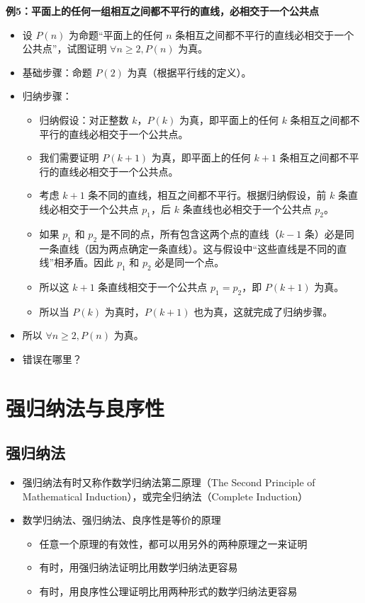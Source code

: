 \documentclass[UTF8]{report}
\theoremstyle{MyLineTheoremStyle} %
\theoremstyle{MyBlockTheoremStyle} %
\theoremstyle{MySubsubsectionStyle} %
\begin{document}
        \textbf{例5：平面上的任何一组相互之间都不平行的直线，必相交于一个公共点}
        \begin{itemize}
            \item 设 $P(n)$ 为命题“平面上的任何 $n$ 条相互之间都不平行的直线必相交于一个公共点”，试图证明 $\forall n \geq 2, P(n)$ 为真。
            \item 基础步骤：命题 $P(2)$ 为真（根据平行线的定义）。
            \item 归纳步骤：
            \begin{itemize}
                \item 归纳假设：对正整数 $k$，$P(k)$ 为真，即平面上的任何 $k$ 条相互之间都不平行的直线必相交于一个公共点。
                \item 我们需要证明 $P(k+1)$ 为真，即平面上的任何 $k+1$ 条相互之间都不平行的直线必相交于一个公共点。
                \item 考虑 $k+1$ 条不同的直线，相互之间都不平行。根据归纳假设，前 $k$ 条直线必相交于一个公共点 $p_1$，后 $k$ 条直线也必相交于一个公共点 $p_2$。
                \item 如果 $p_1$ 和 $p_2$ 是不同的点，所有包含这两个点的直线（$k-1$ 条）必是同一条直线（因为两点确定一条直线）。这与假设中“这些直线是不同的直线”相矛盾。因此 $p_1$ 和 $p_2$ 必是同一个点。
                \item 所以这 $k+1$ 条直线相交于一个公共点 $p_1 = p_2$，即 $P(k+1)$ 为真。
                \item 所以当 $P(k)$ 为真时，$P(k+1)$ 也为真，这就完成了归纳步骤。
            \end{itemize}
            \item 所以 $\forall n \geq 2, P(n)$ 为真。
            \item 错误在哪里？
        \end{itemize}

        \section{强归纳法与良序性}

        \subsection{强归纳法}
        
        \begin{itemize}
            \item 强归纳法有时又称作数学归纳法第二原理（The Second Principle of Mathematical Induction），或完全归纳法（Complete Induction）
            \item 数学归纳法、强归纳法、良序性是等价的原理
            \begin{itemize}
                \item 任意一个原理的有效性，都可以用另外的两种原理之一来证明
                \item 有时，用强归纳法证明比用数学归纳法更容易
                \item 有时，用良序性公理证明比用两种形式的数学归纳法更容易
            \end{itemize}
        \end{itemize}
        
\end{document}
